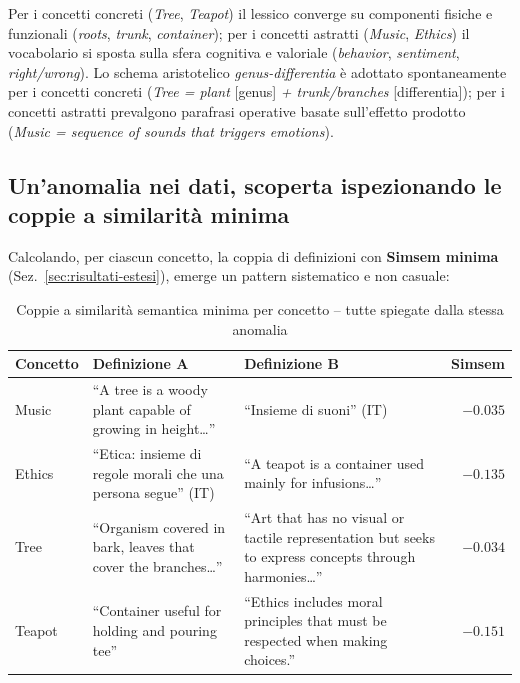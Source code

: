 \documentclass[12pt,a4paper]{article}
\begin{document}
Per i concetti concreti (\textit{Tree}, \textit{Teapot}) il lessico converge su componenti fisiche e funzionali (\textit{roots}, \textit{trunk}, \textit{container}); per i concetti astratti (\textit{Music}, \textit{Ethics}) il vocabolario si sposta sulla sfera cognitiva e valoriale (\textit{behavior}, \textit{sentiment}, \textit{right/wrong}). Lo schema aristotelico \emph{genus-differentia} \`e adottato spontaneamente per i concetti concreti (\textit{Tree = plant} [genus] \textit{+ trunk/branches} [differentia]); per i concetti astratti prevalgono parafrasi operative basate sull'effetto prodotto (\textit{Music = sequence of sounds that triggers emotions}).

\subsection{Un'anomalia nei dati, scoperta ispezionando le coppie a similarit\`a minima}
\label{sec:contaminazione}

Calcolando, per ciascun concetto, la coppia di definizioni con \textbf{Simsem minima} (Sez.~\ref{sec:risultati-estesi}), emerge un pattern sistematico e non casuale:

\begin{table}[H]
  \centering
  \caption{Coppie a similarit\`a semantica minima per concetto -- tutte spiegate dalla stessa anomalia}
  \small
  \begin{tabular}{lp{5.6cm}p{5.6cm}r}
    \toprule
    \textbf{Concetto} & \textbf{Definizione A} & \textbf{Definizione B} & \textbf{Simsem} \\
    \midrule
    Music  & ``A tree is a woody plant capable of growing in height\ldots'' & ``Insieme di suoni'' (IT) & $-0.035$ \\
    Ethics & ``Etica: insieme di regole morali che una persona segue'' (IT) & ``A teapot is a container used mainly for infusions\ldots'' & $-0.135$ \\
    Tree   & ``Organism covered in bark, leaves that cover the branches\ldots'' & ``Art that has no visual or tactile representation but seeks to express concepts through harmonies\ldots'' & $-0.034$ \\
    Teapot & ``Container useful for holding and pouring tee'' & ``Ethics includes moral principles that must be respected when making choices.'' & $-0.151$ \\
    \bottomrule
  \end{tabular}
\end{table}
\end{document}
